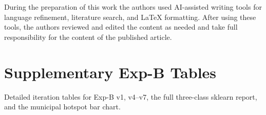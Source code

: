 \documentclass[preprint,times,numbers]{elsarticle}
\begin{document}
During the preparation of this work the authors used AI-assisted writing tools for language refinement, literature search, and \LaTeX{} formatting. After using these tools, the authors reviewed and edited the content as needed and take full responsibility for the content of the published article.

\appendix
\section{Supplementary Exp-B Tables}
\label{app:exp-b}

Detailed iteration tables for Exp-B v1, v4--v7, the full three-class sklearn report, and the municipal hotspot bar chart.



\end{document}
